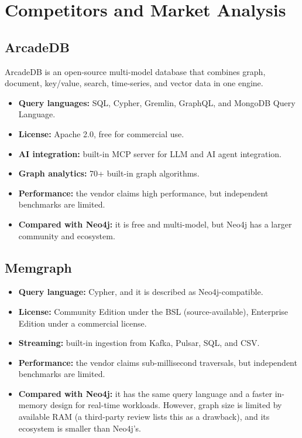 \documentclass[11pt,a4paper]{article}
\begin{document}
\section{Competitors and Market Analysis}

\subsection{ArcadeDB}

ArcadeDB is an open-source multi-model database that combines graph, document, key/value, search, time-series, and vector data in one engine.

\begin{itemize}
  \item \textbf{Query languages:} SQL, Cypher, Gremlin, GraphQL, and MongoDB Query Language.
  \item \textbf{License:} Apache 2.0, free for commercial use.
  \item \textbf{AI integration:} built-in MCP server for LLM and AI agent integration.
  \item \textbf{Graph analytics:} 70+ built-in graph algorithms.
  \item \textbf{Performance:} the vendor claims high performance, but independent benchmarks are limited.
  \item \textbf{Compared with Neo4j:} it is free and multi-model, but Neo4j has a larger community and ecosystem.
\end{itemize}

\subsection{Memgraph}

\begin{itemize}
  \item \textbf{Query language:} Cypher, and it is described as Neo4j-compatible.
  \item \textbf{License:} Community Edition under the BSL (source-available), Enterprise Edition under a commercial license.
  \item \textbf{Streaming:} built-in ingestion from Kafka, Pulsar, SQL, and CSV.
  \item \textbf{Performance:} the vendor claims sub-millisecond traversals, but independent benchmarks are limited.
  \item \textbf{Compared with Neo4j:} it has the same query language and a faster in-memory design for real-time workloads. However, graph size is limited by available RAM (a third-party review lists this as a drawback), and its ecosystem is smaller than Neo4j's.
\end{itemize}
\end{document}
